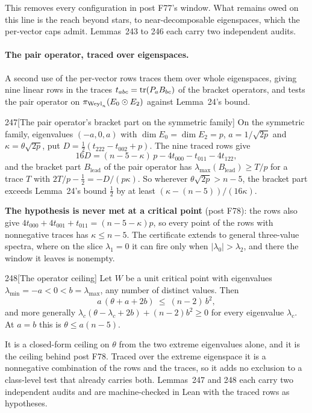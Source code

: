 This removes every configuration in post F77's window. What remains owed on this line is the reach beyond stars, to near-decomposable eigenspaces, which the per-vector caps admit. Lemmas~243 to 246 each carry two independent audits.

\paragraph{The pair operator, traced over eigenspaces.} A second use of the per-vector rows traces them over whole eigenspaces, giving nine linear rows in the traces $t_{abc}=\operatorname{tr}(P_aB_{bc})$ of the bracket operators, and tests the pair operator on $\pi_{\mathrm{Weyl}_n}(E_0\odot E_2)$ against Lemma~24's bound.

\begin{Lem}{247}[The pair operator's bracket part on the symmetric family]
On the symmetric family, eigenvalues $(-a,0,a)$ with $\dim E_0=\dim E_2=p$, $a=1/\sqrt{2p}$ and $\kappa=\theta\sqrt{2p}$, put $D=\tfrac12(t_{222}-t_{002}+p)$. The nine traced rows give
\[
16D=(n-5-\kappa)\,p-4t_{000}-t_{011}-4t_{122},
\]
and the bracket part $B_{\mathrm{lead}}$ of the pair operator has $\lambda_{\max}(B_{\mathrm{lead}})\ge T/p$ for a trace $T$ with $2T/p-\tfrac12=-D/(p\kappa)$. So wherever $\theta\sqrt{2p}>n-5$, the bracket part exceeds Lemma~24's bound $\tfrac12$ by at least $(\kappa-(n-5))/(16\kappa)$.
\end{Lem}

\textbf{The hypothesis is never met at a critical point} (post F78): the rows also give $4t_{000}+4t_{001}+t_{011}=(n-5-\kappa)p$, so every point of the rows with nonnegative traces has $\kappa\le n-5$. The certificate extends to general three-value spectra, where on the slice $\lambda_1=0$ it can fire only when $\lvert\lambda_0\rvert>\lambda_2$, and there the window it leaves is nonempty.

\begin{Lem}{248}[The operator ceiling]
Let $W$ be a unit critical point with eigenvalues $\lambda_{\min}=-a<0<b=\lambda_{\max}$, any number of distinct values. Then
\[
a\,(\theta+a+2b)\ \le\ (n-2)\,b^2 ,
\]
and more generally $\lambda_c(\theta-\lambda_c+2b)+(n-2)b^2\ge0$ for every eigenvalue $\lambda_c$. At $a=b$ this is $\theta\le a(n-5)$.
\end{Lem}

It is a closed-form ceiling on $\theta$ from the two extreme eigenvalues alone, and it is the ceiling behind post F78. Traced over the extreme eigenspace it is a nonnegative combination of the rows and the traces, so it adds no exclusion to a class-level test that already carries both. Lemmas~247 and 248 each carry two independent audits and are machine-checked in Lean with the traced rows as hypotheses.

